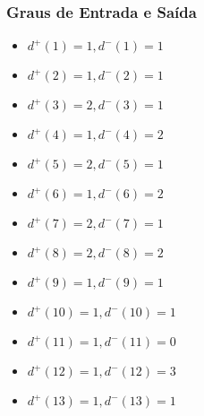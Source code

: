 \documentclass[a4paper,12pt]{article}
\begin{document}
\subsubsection*{Graus de Entrada e Saída}
\begin{multicols}{3}
\begin{itemize}[nosep]
    \item $d^{+}(1)=1, d^{-}(1)=1$
    \item $d^{+}(2)=1, d^{-}(2)=1$
    \item $d^{+}(3)=2, d^{-}(3)=1$
    \item $d^{+}(4)=1, d^{-}(4)=2$
    \item $d^{+}(5)=2, d^{-}(5)=1$
    \item $d^{+}(6)=1, d^{-}(6)=2$
    \item $d^{+}(7)=2, d^{-}(7)=1$
    \item $d^{+}(8)=2, d^{-}(8)=2$
    \item $d^{+}(9)=1, d^{-}(9)=1$
    \item $d^{+}(10)=1, d^{-}(10)=1$
    \item $d^{+}(11)=1, d^{-}(11)=0$
    \item $d^{+}(12)=1, d^{-}(12)=3$
    \item $d^{+}(13)=1, d^{-}(13)=1$
\end{itemize}
\end{multicols}

\end{document}
